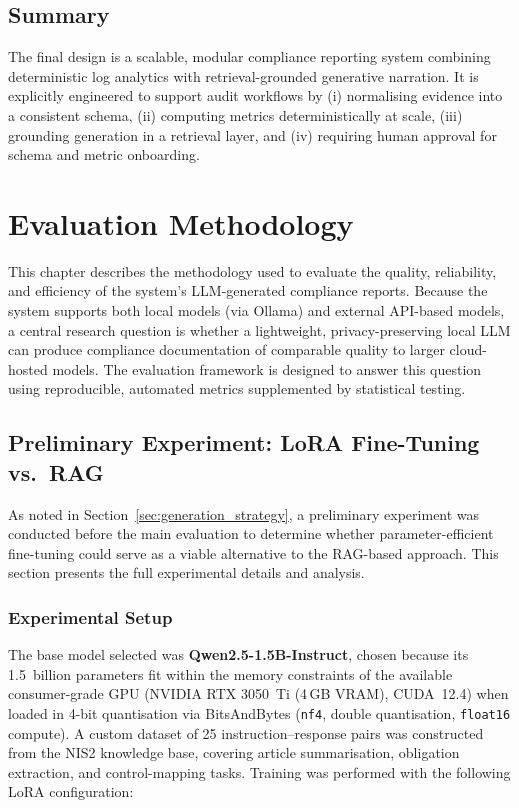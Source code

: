 \documentclass[]{UCD_CS_FYP_Report}
\begin{document}
\section{Summary}
\label{sec:system_design_summary}
The final design is a scalable, modular compliance reporting system combining deterministic log analytics with retrieval-grounded generative narration. It is explicitly engineered to support audit workflows by (i) normalising evidence into a consistent schema, (ii) computing metrics deterministically at scale, (iii) grounding generation in a retrieval layer, and (iv) requiring human approval for schema and metric onboarding.


\chapter{Evaluation Methodology}
\label{chp:eval_methods}

This chapter describes the methodology used to evaluate the quality, reliability, and efficiency of the system's LLM-generated compliance reports. Because the system supports both local models (via Ollama) and external API-based models, a central research question is whether a lightweight, privacy-preserving local LLM can produce compliance documentation of comparable quality to larger cloud-hosted models. The evaluation framework is designed to answer this question using reproducible, automated metrics supplemented by statistical testing.

\section{Preliminary Experiment: LoRA Fine-Tuning vs.\ RAG}
\label{sec:lora_experiment_eval}

As noted in Section~\ref{sec:generation_strategy}, a preliminary experiment was conducted before the main evaluation to determine whether parameter-efficient fine-tuning could serve as a viable alternative to the RAG-based approach. This section presents the full experimental details and analysis.

\subsection{Experimental Setup}

The base model selected was \textbf{Qwen2.5-1.5B-Instruct}, chosen because its 1.5~billion parameters fit within the memory constraints of the available consumer-grade GPU (NVIDIA RTX 3050~Ti (4\,GB VRAM), CUDA~12.4) when loaded in 4-bit quantisation via BitsAndBytes (\texttt{nf4}, double quantisation, \texttt{float16} compute). A custom dataset of 25 instruction--response pairs was constructed from the NIS2 knowledge base, covering article summarisation, obligation extraction, and control-mapping tasks. Training was performed with the following LoRA configuration:
\end{document}
